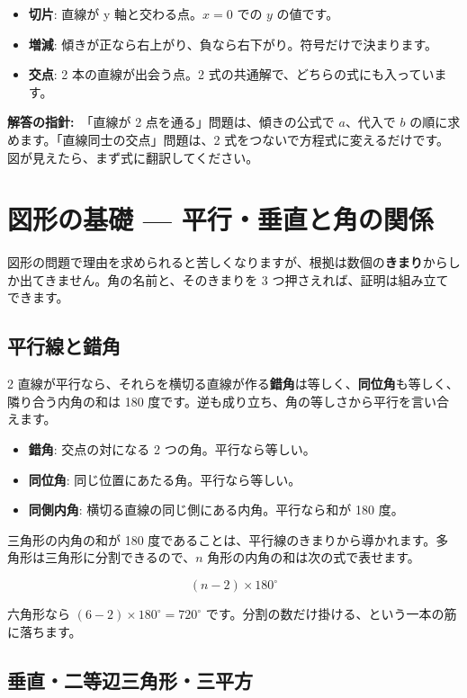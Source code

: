 \documentclass{article}
\begin{document}
\begin{itemize}
\item \textbf{切片}: 直線が y 軸と交わる点。\(x = 0\) での \(y\) の値です。
\item \textbf{増減}: 傾きが正なら右上がり、負なら右下がり。符号だけで決まります。
\item \textbf{交点}: 2 本の直線が出会う点。2 式の共通解で、どちらの式にも入っています。
\end{itemize}

\textbf{解答の指針:}\ 「直線が 2 点を通る」問題は、傾きの公式で \(a\)、代入で \(b\) の順に求めます。「直線同士の交点」問題は、2 式をつないで方程式に変えるだけです。図が見えたら、まず式に翻訳してください。

\section{図形の基礎 — 平行・垂直と角の関係}

図形の問題で理由を求められると苦しくなりますが、根拠は数個の\textbf{きまり}からしか出てきません。角の名前と、そのきまりを 3 つ押さえれば、証明は組み立てできます。

\subsection{平行線と錯角}

2 直線が平行なら、それらを横切る直線が作る\textbf{錯角}は等しく、\textbf{同位角}も等しく、隣り合う内角の和は 180 度です。逆も成り立ち、角の等しさから平行を言い合えます。

\begin{itemize}
\item \textbf{錯角}: 交点の対になる 2 つの角。平行なら等しい。
\item \textbf{同位角}: 同じ位置にあたる角。平行なら等しい。
\item \textbf{同側内角}: 横切る直線の同じ側にある内角。平行なら和が 180 度。
\end{itemize}

三角形の内角の和が 180 度であることは、平行線のきまりから導かれます。多角形は三角形に分割できるので、\(n\) 角形の内角の和は次の式で表せます。

\[ (n - 2) \times 180^{\circ} \]

六角形なら \((6 - 2) \times 180^{\circ} = 720^{\circ}\) です。分割の数だけ掛ける、という一本の筋に落ちます。

\subsection{垂直・二等辺三角形・三平方}
\end{document}
